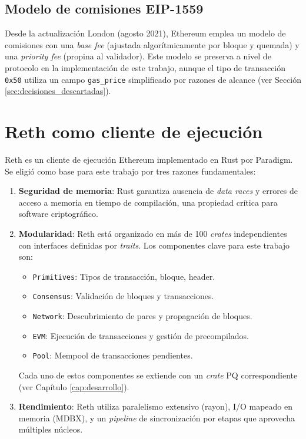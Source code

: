 \subsection{Modelo de comisiones EIP-1559}

Desde la actualización London (agosto 2021), Ethereum emplea un modelo de comisiones con una \emph{base fee} (ajustada algorítmicamente por bloque y quemada) y una \emph{priority fee} (propina al validador). Este modelo se preserva a nivel de protocolo en la implementación de este trabajo, aunque el tipo de transacción \texttt{0x50} utiliza un campo \texttt{gas\_price} simplificado por razones de alcance (ver Sección \ref{sec:decisiones_descartadas}).


\section{Reth como cliente de ejecución}
\label{sec:reth}

Reth \parencite{reth2024} es un cliente de ejecución Ethereum implementado en Rust por Paradigm. Se eligió como base para este trabajo por tres razones fundamentales:

\begin{enumerate}
  \item \textbf{Seguridad de memoria}: Rust garantiza ausencia de \emph{data races} y errores de acceso a memoria en tiempo de compilación, una propiedad crítica para software criptográfico.
  
  \item \textbf{Modularidad}: Reth está organizado en más de 100 \emph{crates} independientes con interfaces definidas por \emph{traits}. Los componentes clave para este trabajo son:
  \begin{itemize}
    \item \texttt{Primitives}: Tipos de transacción, bloque, header.
    \item \texttt{Consensus}: Validación de bloques y transacciones.
    \item \texttt{Network}: Descubrimiento de pares y propagación de bloques.
    \item \texttt{EVM}: Ejecución de transacciones y gestión de precompilados.
    \item \texttt{Pool}: Mempool de transacciones pendientes.
  \end{itemize}
  Cada uno de estos componentes se extiende con un \emph{crate} PQ correspondiente (ver Capítulo \ref{cap:desarrollo}).
  
  \item \textbf{Rendimiento}: Reth utiliza paralelismo extensivo (rayon), I/O mapeado en memoria (MDBX), y un \emph{pipeline} de sincronización por etapas que aprovecha múltiples núcleos.
\end{enumerate}


